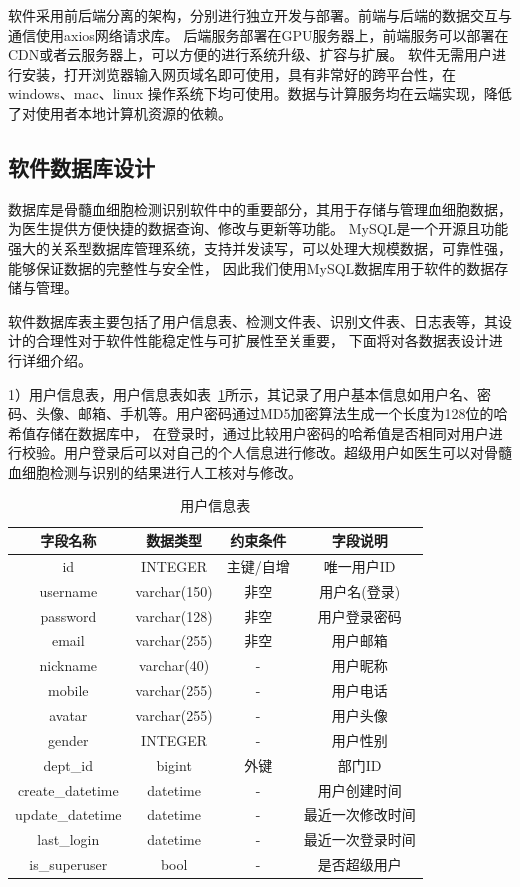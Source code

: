 软件采用前后端分离的架构，分别进行独立开发与部署。前端与后端的数据交互与通信使用axios网络请求库。
后端服务部署在GPU服务器上，前端服务可以部署在CDN或者云服务器上，可以方便的进行系统升级、扩容与扩展。
软件无需用户进行安装，打开浏览器输入网页域名即可使用，具有非常好的跨平台性，在windows、mac、linux
操作系统下均可使用。数据与计算服务均在云端实现，降低了对使用者本地计算机资源的依赖。

\subsection{软件数据库设计}
数据库是骨髓血细胞检测识别软件中的重要部分，其用于存储与管理血细胞数据，为医生提供方便快捷的数据查询、修改与更新等功能。
MySQL是一个开源且功能强大的关系型数据库管理系统，支持并发读写，可以处理大规模数据，可靠性强，能够保证数据的完整性与安全性，
因此我们使用MySQL数据库\cite{christudas2019mysql}用于软件的数据存储与管理。

软件数据库表主要包括了用户信息表、检测文件表、识别文件表、日志表等，其设计的合理性对于软件性能稳定性与可扩展性至关重要，
下面将对各数据表设计进行详细介绍。

1）用户信息表，用户信息表如表~\ref{table:user_table}所示，其记录了用户基本信息如用户名、密码、头像、邮箱、手机等。用户密码通过MD5加密算法生成一个长度为128位的哈希值存储在数据库中，
在登录时，通过比较用户密码的哈希值是否相同对用户进行校验。用户登录后可以对自己的个人信息进行修改。超级用户如医生可以对骨髓血细胞检测与识别的结果进行人工核对与修改。
\begin{table}[htb]
    \caption{用户信息表}   
    \centering 
    \label{table:user_table}
    \begin{tabular*}{0.9\hsize}{@{}@{\extracolsep{\fill}}cccc@{}}
      \toprule[1pt]
      字段名称  &  数据类型 & 约束条件 & 字段说明 \\
      \midrule[1pt] 
      id & INTEGER & 主键/自增 & 唯一用户ID   \\ 
      username & varchar(150) & 非空 & 用户名(登录)   \\ 
      password & varchar(128) & 非空 & 用户登录密码   \\ 
      email    & varchar(255) & 非空 & 用户邮箱 \\
      nickname & varchar(40)  &  -   & 用户昵称  \\ 
      mobile   & varchar(255) &  -   & 用户电话  \\
      avatar   & varchar(255) &  -   & 用户头像  \\
      gender   & INTEGER      &  -   & 用户性别   \\
      dept\_id  & bigint       &  外键   &  部门ID  \\ 
      create\_datetime & datetime & -    & 用户创建时间 \\
      update\_datetime & datetime & -    & 最近一次修改时间 \\
      last\_login & datetime & -           & 最近一次登录时间 \\
      is\_superuser & bool   &  -         & 是否超级用户 \\
      \bottomrule[1pt]      
    \end{tabular*} 
  \end{table}


